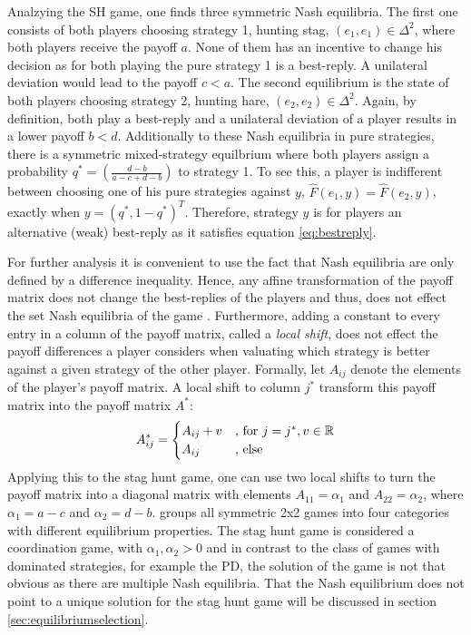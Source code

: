Analzying the SH game, one finds three symmetric Nash equilibria.
The first one consists of both players choosing strategy 1, 
hunting stag, $(e_1,e_1) \in
\Delta^2$, where both players receive the payoff $a$. 
None of them has an incentive to change his decision as for both
playing the pure strategy 1 is a best-reply. A unilateral deviation would 
lead to the payoff $c < a$.
The second equilibrium is the state of 
both players choosing strategy 2, hunting hare, $(e_2,e_2)
\in \Delta^2$. Again, by definition, both play a best-reply and a unilateral 
deviation of a player results in a lower payoff $b<d$.
Additionally to these Nash equilibria in pure strategies, there is a symmetric
mixed-strategy equilbrium where both players assign a probability 
$q^*=\left(\frac{d-b}{a-c+d-b}\right)$ to strategy 1. 
To see this, a player is indifferent between choosing one of his pure
strategies against $y$, $\hat{F}(e_1,y) = \hat{F}(e_2,y)$, exactly
when $y=(q^*,1-q^*)^T$. Therefore, strategy $y$ is for players an alternative
(weak) best-reply as it satisfies equation \eqref{eq:bestreply}.

For further analysis it is convenient to use the fact that Nash equilibria 
are only defined by a difference inequality. 
Hence, any affine transformation of the payoff matrix does not change the 
best-replies of the players and thus, does not effect the set Nash equilibria 
of the game \parencite[17-19]{weibull_evolutionary_1997}. 
Furthermore, adding a constant to every entry in a 
column of the payoff matrix, 
called a \textit{local shift}, does not effect the payoff differences
a player considers when valuating which strategy is better against a given
strategy of the other player.
Formally, let $A_{ij}$ denote the elements of the player's payoff matrix. 
A local shift to column $j^*$ transform this payoff matrix into the payoff 
matrix $A^*$:
\begin{align*}
        A^*_{ij} =
        \begin{cases}
                A_{ij} + v & \text{,\ for}\ j=j^*, v \in \mathbb{R} \\
                A_{ij} & \text{,\ else}
        \end{cases}
\end{align*}
Applying this to the stag hunt game, one can use two local shifts to turn 
the payoff matrix into a diagonal matrix with elements $A_{11}=\alpha_1$ 
and $A_{22}=\alpha_2$, where $\alpha_1=a-c$ and $\alpha_2=d-b$. 
\textcite[28]{weibull_evolutionary_1997} groups all symmetric 2x2 games into 
four categories with different equilibrium properties. 
The stag hunt game is considered a coordination 
game, with $\alpha_1, \alpha_2 > 0$ and in contrast to the class of games
with dominated strategies, for example the PD, the solution of the game
is not that obvious as there are multiple Nash equilibria.
That the Nash equilibrium does not point to a unique solution for the stag
hunt game will be discussed in section \ref{sec:equilibriumselection}.

